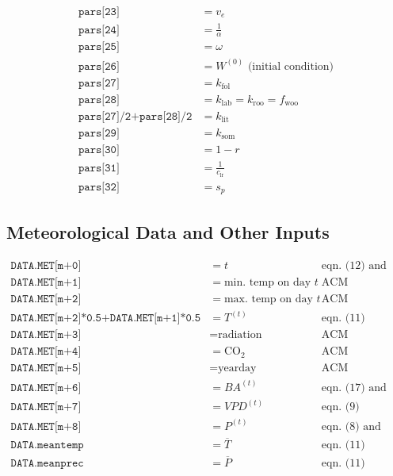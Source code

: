 \documentclass{article}
\begin{document}
\begin{align*}
				\texttt{pars[23]} &= v_e\\
				\texttt{pars[24]} &= \frac{1}{\alpha}\\
				\texttt{pars[25]} &= \omega\\
				\texttt{pars[26]} &= W^{(0)}\text{ (initial condition)}\\
				\texttt{pars[27]} &= k_\text{fol}\\
				\texttt{pars[28]} &= k_\text{lab} = k_\text{roo} = f_\text{woo}\\
				\texttt{pars[27]/2+pars[28]/2} &= k_\text{lit}\\
				\texttt{pars[29]} &= k_\text{som}\\
				\texttt{pars[30]} &= 1-r\\
				\texttt{pars[31]} &= \frac{1}{c_\text{lr}}\\
				\texttt{pars[32]} &= s_p
			\end{align*}

		\subsection{Meteorological Data and Other Inputs}
			\begin{align*}
				\texttt{DATA.MET[m+0]} &= t & \text{eqn. (12) and (13)}\\
				\texttt{DATA.MET[m+1]} &= \text{min. temp on day $t$} & \text{ACM}\\
				\texttt{DATA.MET[m+2]} &= \text{max. temp on day $t$} & \text{ACM}\\
				\texttt{DATA.MET[m+2]*0.5+DATA.MET[m+1]*0.5} &= T^{(t)} & \text{eqn. (11)}\\
				\texttt{DATA.MET[m+3]} &= \text{radiation} & \text{ACM}\\
				\texttt{DATA.MET[m+4]} &= \text{CO}_2 & \text{ACM}\\
				\texttt{DATA.MET[m+5]} &= \text{yearday} & \text{ACM}\\
				\texttt{DATA.MET[m+6]} &= BA^{(t)} & \text{eqn. (17) and (18)}\\
				\texttt{DATA.MET[m+7]} &= VPD^{(t)} & \text{eqn. (9)}\\
				\texttt{DATA.MET[m+8]} &= P^{(t)} & \text{eqn. (8) and (11)}\\
				\texttt{DATA.meantemp} &= \overline{T} & \text{eqn. (11)}\\
				\texttt{DATA.meanprec} &= \overline{P} & \text{eqn. (11)}
			\end{align*}
\end{document}
